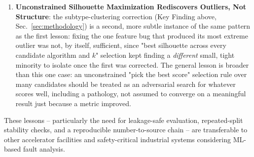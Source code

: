 \begin{enumerate}
    \item \textbf{Unconstrained Silhouette Maximization Rediscovers Outliers, Not Structure}: the subtype-clustering correction (Key Finding above, Sec.~\ref{sec:methodology}) is a second, more subtle instance of the same pattern as the first lesson: fixing the one feature bug that produced its most extreme outlier was not, by itself, sufficient, since "best silhouette across every candidate algorithm and $k$" selection kept finding a \emph{different} small, tight minority to isolate once the first was corrected. The general lesson is broader than this one case: an unconstrained "pick the best score" selection rule over many candidates should be treated as an adversarial search for whatever scores well, including a pathology, not assumed to converge on a meaningful result just because a metric improved.
\end{enumerate}

These lessons -- particularly the need for leakage-safe evaluation, repeated-split stability checks, and a reproducible number-to-source chain -- are transferable to other accelerator facilities and safety-critical industrial systems considering ML-based fault analysis.
